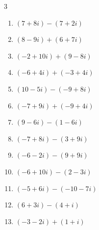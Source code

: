 \begin{multicols}{3}
\begin{enumerate}
        \phantom{$\displaystyle =-14+4i$}

  \item $\displaystyle (7+8i) - (7+2i)$

        \phantom{$\displaystyle =6i$}

\columnbreak %

  \item $\displaystyle (8-9i) + (6+7i)$

        \phantom{$\displaystyle =14-2i$}

  \item $\displaystyle (-2+10i) + (9-8i)$

        \phantom{$\displaystyle =7+2i$}

  \item $\displaystyle (-6+4i) + (-3+4i)$

        \phantom{$\displaystyle =-9+8i$}

  \item $\displaystyle (10-5i) - (-9+8i)$

        \phantom{$\displaystyle =19-13i$}

  \item $\displaystyle (-7+9i) + (-9+4i)$

        \phantom{$\displaystyle =-16+13i$}

  \item $\displaystyle (9-6i) - (1-6i)$

        \phantom{$\displaystyle =8$}

  \item $\displaystyle (-7+8i) - (3+9i)$

        \phantom{$\displaystyle =-10-i$}

  \item $\displaystyle (-6-2i) - (9+9i)$

        \phantom{$\displaystyle =-15-11i$}

  \item $\displaystyle (-6+10i) - (2-3i)$

        \phantom{$\displaystyle =-8+13i$}

  \item $\displaystyle (-5+6i) - (-10-7i)$

        \phantom{$\displaystyle =5+13i$}

  \item $\displaystyle (6+3i) - (4+i)$

        \phantom{$\displaystyle =2+2i$}

  \item $\displaystyle (-3-2i) + (1+i)$


\end{enumerate}
\end{multicols}

